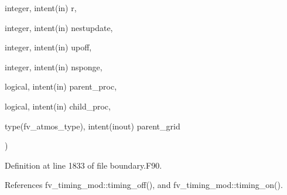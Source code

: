 {\begin{DoxyParamCaption}
\item[{integer, intent(in)}]{r, }
\item[{integer, intent(in)}]{nestupdate, }
\item[{integer, intent(in)}]{upoff, }
\item[{integer, intent(in)}]{nsponge, }
\item[{logical, intent(in)}]{parent\-\_\-proc, }
\item[{logical, intent(in)}]{child\-\_\-proc, }
\item[{type(fv\-\_\-atmos\-\_\-type), intent(inout)}]{parent\-\_\-grid}
\end{DoxyParamCaption}
)}\label{classboundary__mod_a43308affa74c598af21cf7882a128f09}


Definition at line 1833 of file boundary.\-F90.



References fv\-\_\-timing\-\_\-mod\-::timing\-\_\-off(), and fv\-\_\-timing\-\_\-mod\-::timing\-\_\-on().

